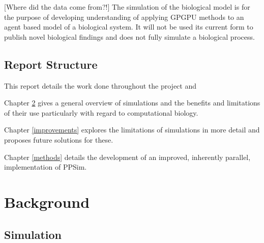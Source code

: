 \documentclass{UoYCSproject}
\begin{document}
[Where did the data come from?!]
The simulation of the biological model is for the purpose of developing understanding of applying GPGPU methods to an agent based model of a biological system. It will not be used its current form to publish novel biological findings and does not fully simulate a biological process.%


\section{Report Structure}
This report details the work done throughout the project and 

Chapter \ref{background} gives a general overview of simulations and the benefits and limitations of their use particularly with regard to computational biology.

Chapter \ref{improvements} explores the limitations of simulations in more detail and proposes future solutions for these.

Chapter \ref{methods} details the development of an improved, inherently parallel, implementation of PPSim.


\chapter{Background}
\label{background}
%


\section{Simulation}
\end{document}
